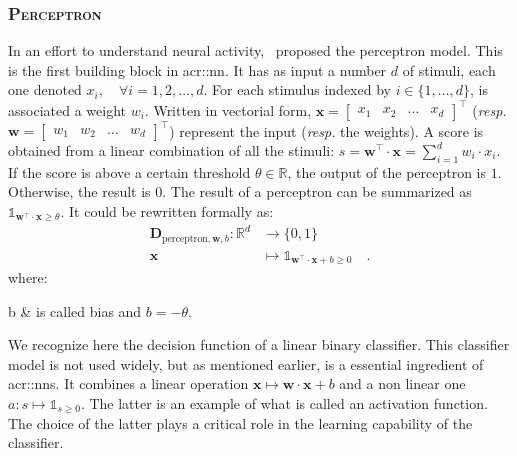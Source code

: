         \subsubsection{\textsc{Perceptron}}
            In an effort to understand neural activity,~\textcite{rosenblatt1958perceptron} proposed the perceptron model.
            This is the first building block in \gls{acr::nn}.
            It has as input a number $d$ of stimuli, each one denoted $x_i,\quad \forall i = 1,2,\dots,d$.
            For each stimulus indexed by $i\in \{1,\dots,d\}$, is associated a weight $w_i$.
            Written in vectorial form, $\bm{x} = \begin{bmatrix}x_1 & x_2 & \hdots  & x_d \end{bmatrix}^\intercal$ (\textit{resp.} $\bm{w} = \begin{bmatrix}w_1 & w_2 & \hdots & w_d \end{bmatrix}^\intercal$) represent the input (\textit{resp.} the weights).
            A score is obtained from a linear combination of all the stimuli: $s = \bm{w}^\intercal \cdot \bm{x} = \sum_{i=1}^{d} w_i \cdot x_i$.
            If the score is above a certain threshold $\theta \in \mathbb{R}$, the output of the perceptron is $1$.
            Otherwise, the result is $0$.
            The result of a perceptron can be summarized as $\mathbb{1}_{\bm{w}^\intercal \cdot \bm{x} \geq \theta}$.
            It could be rewritten formally as:
            \begin{equation}
                \label{eq::perceptron}
                \begin{aligned}
                    \mathbf{D}_{\text{perceptron}, \bm{w}, b}: \mathbb{R}^d &\rightarrow \{0, 1\}\\
                    \bm{x} &\mapsto \mathbb{1}_{\bm{w}^\intercal \cdot \bm{x} + b\geq 0} \quad.
                \end{aligned}
            \end{equation}
            where:
            \begin{conditions}
                b & is called bias and $b = - \theta $.
            \end{conditions}
            We recognize here the decision function of a linear binary classifier.
            This classifier model is not used widely, but as mentioned earlier, is a essential ingredient of \glspl{acr::nn}.
            It combines a linear operation $\bm{x} \mapsto \bm{w} \cdot \bm{x} + b$ and a non linear one $a: s \mapsto \mathbb{1}_{s \geq 0}$.
            The latter is an example of what is called an activation function.
            The choice of the latter plays a critical role in the learning capability of the classifier.
